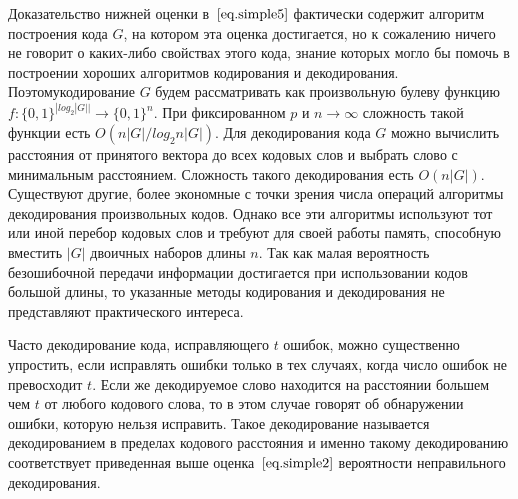 \documentclass[12pt]{article}
\numberwithin{equation}{section}
\begin{document}
Доказательство нижней оценки в~$\eqref{eq.simple5}$ фактически содержит алгоритм построения кода $G$, на котором эта оценка достигается, но к сожалению ничего не говорит о каких-либо свойствах этого кода, знание которых могло бы помочь в построении хороших алгоритмов кодирования и декодирования. Поэтомукодирование $G$ будем рассматривать как произвольную булеву функцию $f : \{0, 1\}^{| log_2 |G||}\rightarrow \{0, 1\}^n$. При фиксированном $p$ и $n →\infty$ сложность такой функции есть
$O(n|G|/ log_2 n|G|)$. Для декодирования кода $G$ можно вычислить расстояния от принятого вектора до всех кодовых слов и выбрать слово с минимальным расстоянием. Сложность такого декодирования есть $O(n|G|)$. Существуют другие, более экономные с точки зрения числа операций алгоритмы декодирования произвольных кодов. Однако все эти алгоритмы используют тот или иной перебор кодовых слов и требуют для своей работы память, способную вместить $|G|$ двоичных наборов длины $n$. Так как малая вероятность безошибочной передачи информации достигается при использовании кодов большой длины, то указанные методы кодирования и декодирования не представляют практического интереса.

Часто декодирование кода, исправляющего $t$ ошибок, можно существенно упростить, если исправлять ошибки только в тех случаях, когда число
ошибок не превосходит $t$. Если же декодируемое слово находится на расстоянии большем чем $t$ от любого кодового слова, то в этом случае говорят об обнаружении ошибки, которую нельзя исправить. Такое декодирование называется декодированием в пределах кодового расстояния и именно такому декодированию соответствует приведенная выше оценка~$\eqref{eq.simple2}$ вероятности неправильного декодирования.
\end{document}
